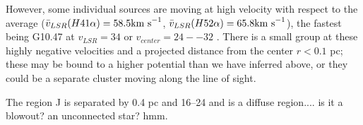 \documentclass[twocolumn]{aastex61}
\begin{document}
However, some individual sources are moving at high velocity with respect to
the average ($\bar{v}_{LSR}(H41\alpha) = 58.5 \textrm{km~s}^{-1}$,
$\bar{v}_{LSR}(H52\alpha) = 65.8 \textrm{km~s}^{-1}$), the fastest being G10.47 at
$v_{LSR}=34$ \kms or $v_{center}=24--32$ \kms.  There is a small group
at these highly negative velocities and a projected distance from the center $r<0.1$ pc;
these may be bound to a higher potential than we have inferred above, or they
could be a separate cluster moving along the line of sight.

The \hii region J is separated by 0.4 pc and 16--24 \kms and is a diffuse \hii region.... is it a blowout?   an unconnected star?  hmm.


\end{document}
